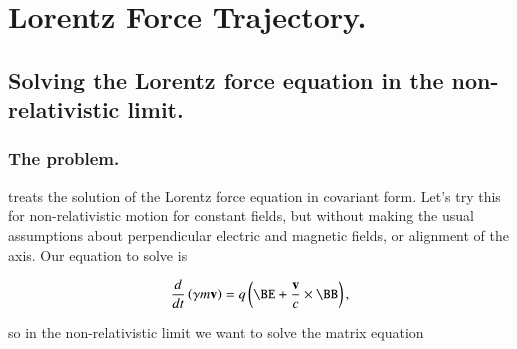 %
%

\chapter{Lorentz Force Trajectory.}
\label{chap:lorentzRotation}
\date{May 7, 2008.}
{}

\beginArtWithToc

\section{Solving the Lorentz force equation in the non-relativistic limit.}

\subsection{The problem.}

\cite{doran2003gap} treats the solution of the Lorentz force equation in covariant form.  Let's try this for non-relativistic motion for constant fields, but without making the usual assumptions about perpendicular electric and magnetic fields, or alignment of the axis.  Our equation to solve is

%
%

\begin{equation}\label{eqn:lorentzRotation:10}
\frac{d}{dt} \left( \gamma m \Bv \right) = q \left( \BE + \frac{\Bv}{c} \times \BB \right),
\end{equation}

so in the non-relativistic limit we want to solve the matrix equation

